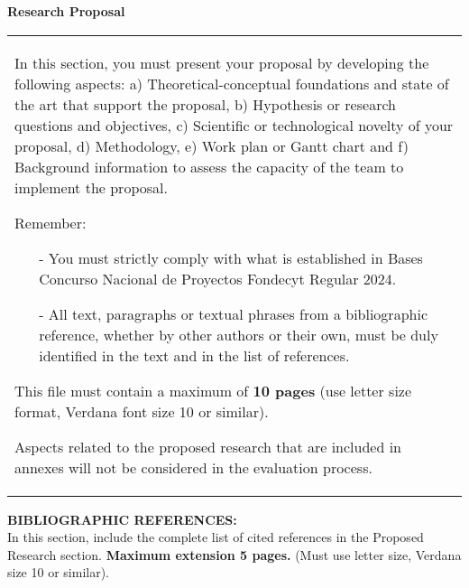 \documentclass[10pt]{article}
\begin{document}
\noindent
\textbf{Research Proposal} \\

{\raggedright

\vspace{3pt} \noindent
\begin{tabular}{|p{\textwidth}|}
\hline
\parbox{\textwidth} {\raggedright  \vspace{3pt}
In this section, you must present your proposal by developing the following aspects: a) Theoretical-conceptual foundations and state of the art that support the proposal, b) Hypothesis or research questions and objectives, c) Scientific or technological novelty of your proposal, d) Methodology, e) Work plan or Gantt chart and f) Background information to assess the capacity of the team to implement the proposal.

\vspace{2mm}

Remember:
\begin{itemize}
\item[-] You must strictly comply with what is established in Bases Concurso Nacional de Proyectos Fondecyt Regular 2024.
\item[-] All text, paragraphs or textual phrases from a bibliographic reference, whether by other authors or their own, must be duly identified in the text and in the list of references.
\end{itemize}

This file must contain a maximum of {\bf 10 pages} (use letter size format, Verdana font size 10 or similar).

\vspace{2mm}

Aspects related to the proposed research that are included in annexes will not be considered in the evaluation process.}\\
\hline
\end{tabular}
\vspace{2pt}

}


\newpage

\noindent
\textbf{BIBLIOGRAPHIC REFERENCES:} \\
In this section, include the
complete list of cited references in the Proposed Research
section. {\bf Maximum extension 5 pages.} (Must use letter size, Verdana
size 10 or similar).
\\
\\
\end{document}
